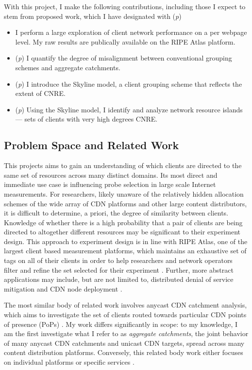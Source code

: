 With this project, I make the following contributions, including those I expect to stem from
proposed work, which I have designated with (\emph{p})

\begin{itemize}\parskip0pt 
    \item I perform a large exploration of client network performance on a per webpage level. My
        raw results are publically available on the RIPE Atlas platform.
    \item (\emph{p}) I quantify the degree of misalignment between conventional grouping schemes
        and aggregate catchments.
    \item (\emph{p}) I introduce the Skyline model, a client grouping scheme that reflects the
        extent of CNRE.
    \item (\emph{p}) Using the Skyline model, I identify and analyze network resource islands --- 
        sets of clients with very high degrees CNRE. 
\end{itemize}

\subsection{Problem Space and Related Work} \label{skyspace}

This projects aims to gain an understanding of which clients are directed to the same set of
resources across many distinct domains. Its most direct and immediate use case is influencing probe
selection in large scale Internet measurements. For researchers, likely unaware of the relatively
hidden allocation schemes of the wide array of CDN platforms and other large content distributors,
it is difficult to determine, a priori, the degree of similarity between clients. Knowledge of
whether there is a high probability that a pair of clients are being directed to altogether
different resources may be significant to their experiment design. This approach to experiment
design is in line with RIPE Atlas, one of the largest client based measurement platforms,
which maintains
an exhaustive set of tags on all of their clients in order to help researchers and network operators
filter and refine the set selected for their experiment \cite{ripe-atlas}. Further, more abstract
applications may include, but are not limited to, distributed denial of service mitigation
\cite{anycastvsddos} and CDN node deployment \cite{35590, Tariq}.

The most similar body of related work involves anycast CDN catchment analysis, which aims to
investigate the set of clients routed towards particular CDN points of presence (PoPs)
\cite{Calder2015, anycastvsddos, vdmscatchment}. My work differs significantly in scope: to my
knowledge, I am the first investigate what I refer to as \emph{aggregate catchments}, the joint
behavior of many anycast CDN catchments and unicast CDN targets, spread across many content
distribution platforms. Conversely, this related body work either focuses on individual platforms or
specific services \cite{Calder2015, anycastvsddos, vdmscatchment}. 

